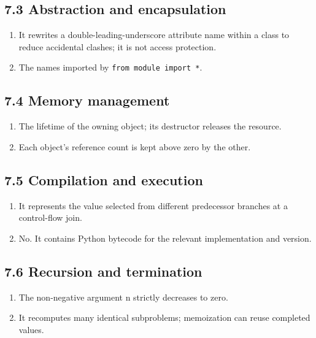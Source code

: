 \documentclass[11pt]{article}
\begin{document}
\begin{keepsection}\subsection{7.3 Abstraction and encapsulation}

\begin{enumerate}
\item It rewrites a double-leading-underscore attribute name within a class to reduce accidental clashes; it is not access protection.
\item The names imported by \texttt{from module import *}.
\end{enumerate}

\end{keepsection}
\begin{keepsection}\subsection{7.4 Memory management}

\begin{enumerate}
\item The lifetime of the owning object; its destructor releases the resource.
\item Each object’s reference count is kept above zero by the other.
\end{enumerate}

\end{keepsection}
\begin{keepsection}\subsection{7.5 Compilation and execution}

\begin{enumerate}
\item It represents the value selected from different predecessor branches at a control-flow join.
\item No. It contains Python bytecode for the relevant implementation and version.
\end{enumerate}

\end{keepsection}
\begin{keepsection}\subsection{7.6 Recursion and termination}

\begin{enumerate}
\item The non-negative argument n strictly decreases to zero.
\item It recomputes many identical subproblems; memoization can reuse completed values.
\end{enumerate}

\end{keepsection}
\end{document}
